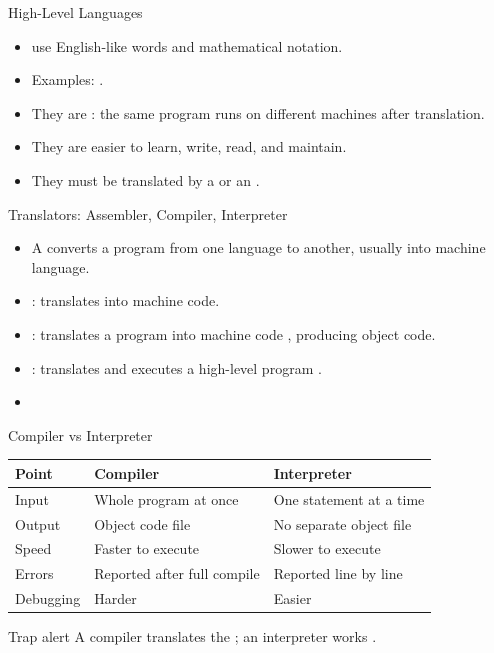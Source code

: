 \documentclass[aspectratio=169]{beamer}
\begin{document}
\begin{frame}{High-Level Languages}
  \begin{itemize}
    \item {} use English-like words and
      mathematical notation.
    \item Examples: .
    \item They are : the same program runs on
      different machines after translation.
    \item They are easier to learn, write, read, and maintain.
    \item They must be translated by a  or an
      .
  \end{itemize}
\end{frame}

\begin{frame}{Translators: Assembler, Compiler, Interpreter}
  \begin{itemize}
    \item A  converts a program from one language to
      another, usually into machine language.
    \item {}: translates  into machine
      code.
    \item {}: translates a  program into
      machine code , producing object code.
    \item {}: translates and executes a high-level program
      .
    \item {}
  \end{itemize}
\end{frame}

\begin{frame}{Compiler vs Interpreter}
  \begin{center}
    \begin{tabular}{p{}p{}p{}}
      \toprule
      \textbf{Point} & \textbf{Compiler} & \textbf{Interpreter} \\
      \midrule
      Input & Whole program at once & One statement at a time \\
      Output & Object code file & No separate object file \\
      Speed & Faster to execute & Slower to execute \\
      Errors & Reported after full compile & Reported line by line \\
      Debugging & Harder & Easier \\
      \bottomrule
    \end{tabular}
  \end{center}
  \vspace{0.2cm}
  \begin{alertblock}{Trap alert}
    A compiler translates the ; an interpreter
    works .
  \end{alertblock}
\end{frame}
\end{document}
